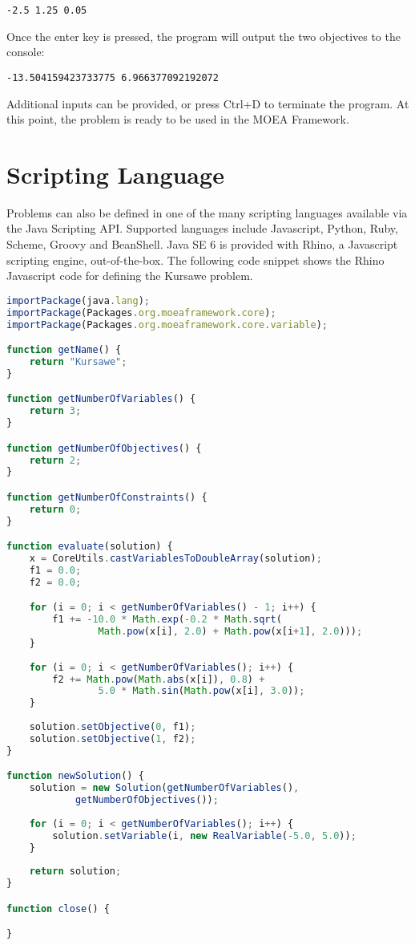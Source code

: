 \begin{lstlisting}[language=Plaintext]
-2.5 1.25 0.05
\end{lstlisting}

Once the enter key is pressed, the program will output the two objectives to the console:

\begin{lstlisting}[language=Plaintext]
-13.504159423733775 6.966377092192072
\end{lstlisting}

Additional inputs can be provided, or press Ctrl+D to terminate the program.  At this point, the problem is ready to be used in the MOEA Framework.

\section{Scripting Language}
Problems can also be defined in one of the many scripting languages available via the Java Scripting API.  Supported languages include Javascript, Python, Ruby, Scheme, Groovy and BeanShell.  Java SE 6 is provided with Rhino, a Javascript scripting engine, out-of-the-box.  The following code snippet shows the Rhino Javascript code for defining the Kursawe problem.

\begin{lstlisting}[language=JavaScript]
importPackage(java.lang);
importPackage(Packages.org.moeaframework.core);
importPackage(Packages.org.moeaframework.core.variable);

function getName() {
	return "Kursawe";
}

function getNumberOfVariables() {
	return 3;
}

function getNumberOfObjectives() {
	return 2;
}

function getNumberOfConstraints() {
	return 0;
}

function evaluate(solution) {
	x = CoreUtils.castVariablesToDoubleArray(solution);
	f1 = 0.0;
	f2 = 0.0;

	for (i = 0; i < getNumberOfVariables() - 1; i++) {
		f1 += -10.0 * Math.exp(-0.2 * Math.sqrt(
				Math.pow(x[i], 2.0) + Math.pow(x[i+1], 2.0)));
	}
 
	for (i = 0; i < getNumberOfVariables(); i++) {
		f2 += Math.pow(Math.abs(x[i]), 0.8) +  
				5.0 * Math.sin(Math.pow(x[i], 3.0));
	}
 
	solution.setObjective(0, f1);
	solution.setObjective(1, f2);
}

function newSolution() {
	solution = new Solution(getNumberOfVariables(), 
			getNumberOfObjectives());
 
	for (i = 0; i < getNumberOfVariables(); i++) {
		solution.setVariable(i, new RealVariable(-5.0, 5.0));
	}
 
	return solution;
}

function close() {

}
\end{lstlisting}

